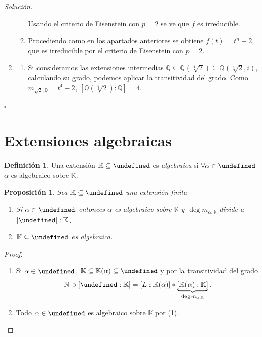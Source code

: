 \documentclass[10pt, spanish]{report}
\newtheorem{prop}[tma]{Proposición}
\theoremstyle{definition}
\newtheorem*{defin}{Definición}
\theoremstyle{custom}
\newenvironment{sol}{\textit{Solución.}}{\hfill$\square$}
\theoremstyle{remark}
\newcommand{\N}{\mathbb{N}}
\newcommand{\Q}{\mathbb{Q}}
\newcommand{\K}{\mathbb{K}}
\let\L\undefined
\newcommand{\L}{\mathbb{L}}
\newcommand{\fecha}[1]{\marginpar{\underline{\footnotesize{#1}}}}
\begin{document}
\begin{sol}
\begin{enumerate}
\begin{enumerate}
                     Usando el criterio de Eisenstein con $p=2$ se ve que $f$ es
                     irreducible.
                \item Procediendo como en los apartados anteriores se obtiene
                    $f(t)=t^n-2$, que es irreducible por el criterio de
                    Eisenstein con $p=2$.
            \end{enumerate}
        \item
            \begin{enumerate}
                \item Si consideramos las extensiones intermedias
                    $\Q\subseteq\Q(\sqrt[4]{2})\subseteq\Q(\sqrt[4]{2},i)$,
                    calculando su grado, podemos aplicar la transitividad del
                    grado. Como $m_{\sqrt{2},\Q}=t^4-2$,
                    $[\Q(\sqrt[4]{2}):\Q]=4$.
            \end{enumerate}
    \end{enumerate}\vspace{-1.75em}
\end{sol}
\fecha{1/03}
\section{Extensiones algebraicas}
\begin{defin}
    Una extensión $\K\subseteq\L$ es \textit{algebraica} si
    $\forall\alpha\in\L$ $\alpha$ es algebraico sobre $\K$.
\end{defin}

\begin{prop}
    Sea $\K\subseteq\L$ una extensión finita
    \begin{enumerate}
        \item Si $\alpha\in \L$ entonces $\alpha$ es algebraico sobre $\K$ y
            $\deg{m_{\alpha,\K}}$ divide a $[\L]:\K$.
        \item $\K\subseteq\L$ es algebraica.
    \end{enumerate}
\end{prop}

\begin{proof}\hspace{0pt}
    \begin{enumerate}
        \item Si $\alpha\in\L$,  $\K\subseteq\K(\alpha)\subseteq\L$  y por la
            transitividad del grado
            \[\N\ni[\L:\K]=[L:\K(\alpha)]*\underbrace{[\K(\alpha):\K]}_{\deg{m_{\alpha,\K}}}.\]
        \item Todo $\alpha\in\L$ es algebraico sobre $\K$ por (1).
    \end{enumerate}\vspace{-1.75em}
\end{proof}
\end{document}
